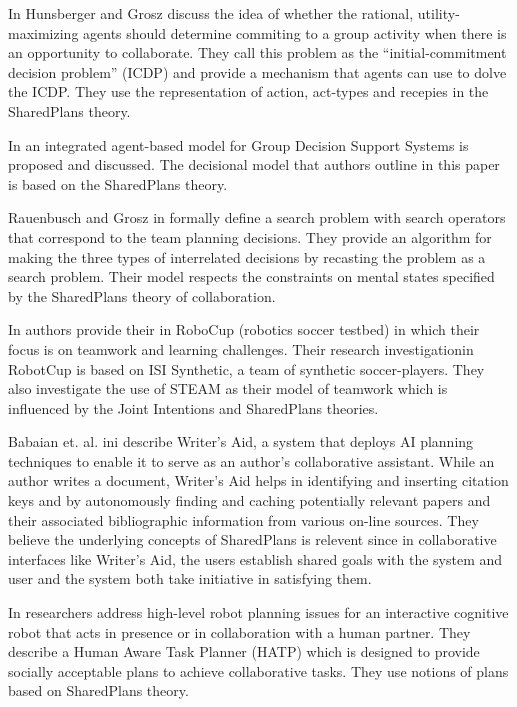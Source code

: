 \documentclass[11pt]{article}
\begin{document}
In \cite{hunsberger:auction-collaborative} Hunsberger and Grosz discuss the idea
of whether the rational, utility-maximizing agents should determine commiting to
a group activity when there is an opportunity to collaborate. They call this
problem as the ``initial-commitment decision problem'' (ICDP) and provide a
mechanism that agents can use to dolve the ICDP. They use the representation of
action, act-types and recepies in the SharedPlans theory.

In \cite{zamfirescu:gdss} an integrated agent-based model for Group Decision
Support Systems is proposed and discussed. The decisional model that authors
outline in this paper is based on the SharedPlans theory.

Rauenbusch and Grosz in \cite{rauenbusch:decision-making-planning} formally
define a search problem with search operators that correspond to the team
planning decisions. They provide an algorithm for making the three types of
interrelated decisions by recasting the problem as a search problem. Their model
respects the constraints on mental states specified by the SharedPlans theory of
collaboration.

In \cite{marsella:robocup} authors provide their in RoboCup (robotics soccer
testbed) in which their focus is on teamwork and learning challenges. Their
research investigationin RobotCup is based on ISI Synthetic, a team of synthetic
soccer-players. They also investigate the use of STEAM as their model of
teamwork which is influenced by the Joint Intentions and SharedPlans theories.

Babaian et. al. ini \cite{babaian:writers-assistant} describe Writer’s Aid, a
system that deploys AI planning techniques to enable it to serve as an author’s
collaborative assistant. While an author writes a document, Writer’s Aid helps
in identifying and inserting citation keys and by autonomously finding and
caching potentially relevant papers and their associated bibliographic
information from various on-line sources. They believe the underlying concepts
of SharedPlans is relevent since in collaborative interfaces like Writer’s Aid,
the users establish shared goals with the system and user and the system
both take initiative in satisfying them.

In \cite{montreuil:planning-robot-activity} researchers address high-level robot
planning issues for an interactive cognitive robot that acts in presence or in
collaboration with a human partner. They describe a Human Aware Task Planner
(HATP) which is designed to provide socially acceptable plans to achieve
collaborative tasks. They use notions of plans based on SharedPlans theory.
\end{document}
